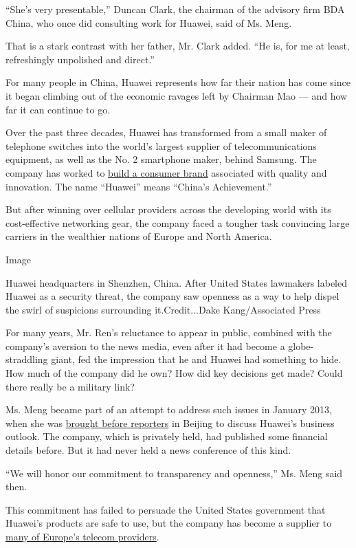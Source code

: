 ``She's very presentable,'' Duncan Clark, the chairman of the advisory
firm BDA China, who once did consulting work for Huawei, said of Ms.
Meng.

That is a stark contrast with her father, Mr. Clark added. ``He is, for
me at least, refreshingly unpolished and direct.''

For many people in China, Huawei represents how far their nation has
come since it began climbing out of the economic ravages left by
Chairman Mao --- and how far it can continue to go.

Over the past three decades, Huawei has transformed from a small maker
of telephone switches into the world's largest supplier of
telecommunications equipment, as well as the No. 2 smartphone maker,
behind Samsung. The company has worked to
\href{https://www.nytimes.com/2017/11/19/technology/huawei-mate-10-smartphone.html}{build
a consumer brand} associated with quality and innovation. The name
``Huawei'' means ``China's Achievement.''

But after winning over cellular providers across the developing world
with its cost-effective networking gear, the company faced a tougher
task convincing large carriers in the wealthier nations of Europe and
North America.

Image

Huawei headquarters in Shenzhen, China. After United States lawmakers
labeled Huawei as a security threat, the company saw openness as a way
to help dispel the swirl of suspicions surrounding it.Credit...Dake
Kang/Associated Press

For many years, Mr. Ren's reluctance to appear in public, combined with
the company's aversion to the news media, even after it had become a
globe-straddling giant, fed the impression that he and Huawei had
something to hide. How much of the company did he own? How did key
decisions get made? Could there really be a military link?

Ms. Meng became part of an attempt to address such issues in January
2013, when she was
\href{https://blogs.wsj.com/chinarealtime/2013/01/21/a-confusing-debut-for-daughter-of-mysterious-huawei-founder/}{brought
before reporters} in Beijing to discuss Huawei's business outlook. The
company, which is privately held, had published some financial details
before. But it had never held a news conference of this kind.

``We will honor our commitment to transparency and openness,'' Ms. Meng
said then.

This commitment has failed to persuade the United States government that
Huawei's products are safe to use, but the company has become a supplier
to
\href{https://www.nytimes.com/2012/10/12/business/global/huawei-chinese-telecom-company-finds-warmer-welcome-in-europe.html}{many
of Europe's telecom providers}.


